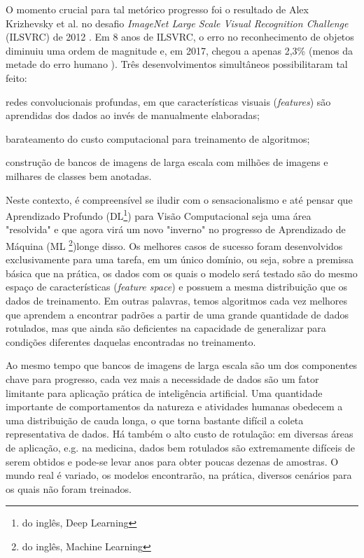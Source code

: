 \documentclass[
12pt, %
a4paper, %
onecolumn, %
]{article}
\begin{document}
O momento crucial para tal metórico progresso foi o resultado de Alex Krizhevsky et al.\cite{alexnet} no desafio \textit{ImageNet Large Scale Visual Recognition Challenge}  (ILSVRC) de 2012 \cite{goodfellow}. Em 8 anos de ILSVRC, o erro no reconhecimento de objetos diminuiu uma ordem de magnitude\cite{fei} e, em 2017, chegou a apenas 2,3\% (menos da metade do erro humano \cite{KHe}). Três desenvolvimentos simultâneos possibilitaram tal feito\cite{horn}: 
\begin{enumerate*}[label=(\alph*)]
  \item redes convolucionais profundas, em que características visuais (\textit{features}) são aprendidas dos dados ao invés de manualmente elaboradas;
  \item barateamento do custo computacional para treinamento de algoritmos;
  \item construção de bancos de imagens de larga escala com milhões de imagens e milhares de classes bem anotadas. 
\end{enumerate*}

Neste contexto, é compreensível se iludir com o sensacionalismo e até pensar que Aprendizado Profundo (DL\footnote{do inglês, Deep Learning}) para Visão Computacional seja uma área "resolvida" e que agora virá um novo "inverno" no progresso de Aprendizado de Máquina (ML \footnote{do inglês, Machine Learning})\textemdash longe disso. Os melhores casos de sucesso foram desenvolvidos exclusivamente para uma tarefa, em um único domínio, ou seja, sobre a premissa básica que na prática, os dados com os quais o modelo será testado são do mesmo espaço de características (\textit{feature space}) e possuem a mesma distribuição que os dados de treinamento\cite{Pan}. Em outras palavras, temos algoritmos cada vez melhores que aprendem a encontrar padrões a partir de uma grande quantidade de dados rotulados, mas que ainda são deficientes na capacidade de generalizar para condições diferentes daquelas encontradas no treinamento. 

Ao mesmo tempo que bancos de imagens de larga escala são um dos componentes chave para progresso, cada vez mais a necessidade de dados são um fator limitante para aplicação prática de inteligência artificial.  Uma quantidade importante de comportamentos da natureza e atividades humanas obedecem a uma distribuição de cauda longa, o que torna bastante difícil a coleta representativa de dados. Há também o  alto custo de rotulação: em diversas áreas de aplicação, e.g. na medicina, dados bem rotulados são extremamente difíceis de serem obtidos e pode-se levar anos para obter poucas dezenas de amostras. O mundo real é variado, os modelos encontrarão, na prática, diversos cenários para os quais não foram treinados.
\end{document}
